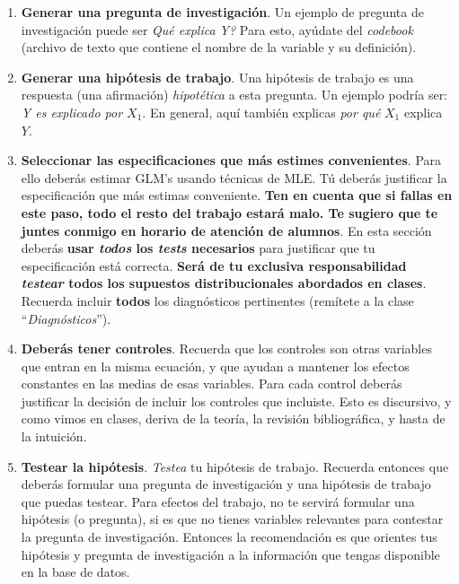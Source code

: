 \documentclass[10pt]{article}
\begin{document}
\begin{enumerate}
  \item {\bf Generar una pregunta de investigaci\'on}. Un ejemplo de pregunta de investigaci\'on puede ser \emph{Qu\'e explica Y?} Para esto, ay\'udate del \emph{codebook} (archivo de texto que contiene el nombre de la variable y su definici\'on).
  
  \item {\bf Generar una hip\'otesis de trabajo}. Una hip\'otesis de trabajo es una respuesta (una afirmaci\'on) \emph{hipot\'etica} a esta pregunta. Un ejemplo podr\'ia ser: \emph{Y es explicado por $X_{1}$}. En general, aqu\'i tambi\'en explicas \emph{por qu\'e} $X_{1}$ explica $Y$.
  
  
  \item {\bf Seleccionar las especificaciones que m\'as estimes convenientes}. Para ello deber\'as estimar GLM's usando t\'ecnicas de MLE. T\'u deber\'as justificar la especificaci\'on que m\'as estimas conveniente. {\bf Ten en cuenta que si fallas en este paso, todo el resto del trabajo estar\'a malo. Te sugiero que te juntes conmigo en horario de atenci\'on de alumnos}. En esta secci\'on deber\'as {\bf usar \emph{todos} los \emph{tests} necesarios} para justificar que tu especificaci\'on est\'a correcta. {\bf Ser\'a de tu exclusiva responsabilidad \emph{testear} todos los supuestos distribucionales abordados en clases}. Recuerda incluir {\bf todos} los diagn\'osticos pertinentes (rem\'itete a la clase ``\emph{Diagn\'osticos}'').

  
  \item {\bf Deber\'as tener controles}. Recuerda que los controles son otras variables que entran en la misma ecuaci\'on, y que ayudan a mantener los efectos constantes en las medias de esas variables. Para cada control deber\'as justificar la decisi\'on de incluir los controles que incluiste. Esto es discursivo, y como vimos en clases, deriva de la teor\'ia, la revisi\'on bibliogr\'afica, y hasta de la intuici\'on. 


  \item {\bf Testear la hip\'otesis}. \emph{Testea} tu hip\'otesis de trabajo.  Recuerda entonces que deber\'as formular una pregunta de investigaci\'on y una hip\'otesis de trabajo que puedas testear. Para efectos del trabajo, no te servir\'a formular una hip\'otesis (o pregunta), si es que no tienes variables relevantes para contestar la pregunta de investigaci\'on. Entonces la recomendaci\'on es que orientes tus hip\'otesis y pregunta de investigaci\'on a la informaci\'on que tengas disponible en la base de datos.


\end{enumerate}
\end{document}
